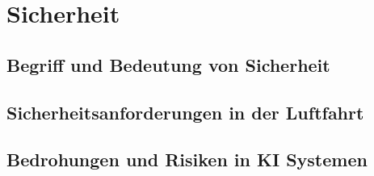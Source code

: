 \part{Sicherheit}
\chapter{Begriff und Bedeutung von Sicherheit}

\chapter{Sicherheitsanforderungen in der Luftfahrt}

\chapter{Bedrohungen und Risiken in \ac{KI} Systemen}